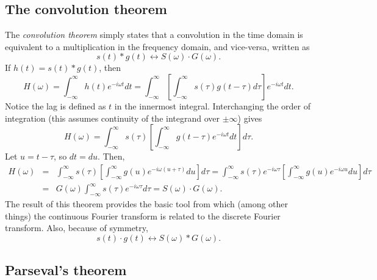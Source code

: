 \subsection{The convolution theorem}
\label{sec:convolutiontheorem}
	The \emph{convolution theorem} simply states that a convolution in the time domain is equivalent to
a multiplication in the frequency domain, and vice-versa, written as
\begin{equation}
s(t) * g(t) \leftrightarrow S (\omega) \cdot G (\omega).
\end{equation}
If $h(t) = s(t) * g(t)$, then
$$
H (\omega) = \int^\infty_{-\infty} h(t) e^{-i \omega t} dt = \int^\infty_{-\infty} \left [ \int^\infty_{-\infty} s(\tau) g (t- \tau) d\tau \right ]
e^{-i \omega t} dt.
$$
Notice the lag is defined as $t$ in the innermost integral. Interchanging the order of integration (this assumes
continuity of the integrand over $\pm\infty$) gives
$$
H (\omega) = \int^\infty_{-\infty} s(\tau) \left[ \int^\infty_{-\infty} g( t - \tau) e^{-i \omega t} dt \right ] d\tau.
$$
Let $u = t - \tau$, so $dt = du$. Then,
$$
\begin{array}{rcl}
H (\omega) & = & \displaystyle \int^\infty_{-\infty} s(\tau) \left[ \int^\infty_{-\infty} g(u)
e^{-i \omega(u + \tau)} du \right ] d\tau = \int^\infty_{-\infty} s(\tau) e^{-i \omega \tau}
\left[ \int^\infty_{-\infty} g(u) e^{-i \omega u} du \right ] d\tau \\[10pt]
& = & \displaystyle G (\omega) \int^\infty_{-\infty} s(\tau) e^{-i \omega \tau} d\tau = S(\omega) \cdot G (\omega).
\end{array}
$$
The result of this theorem provides the basic tool from which (among other things) the
continuous Fourier transform is related to the discrete Fourier transform. Also, because
of symmetry,
\begin{equation}
s(t) \cdot g (t) \leftrightarrow S (\omega) * G (\omega).
\end{equation}

\subsection{Parseval's theorem}
\label{sec:Parseval}

